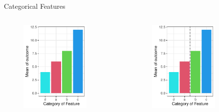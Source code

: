 \documentclass[11pt,compress,t,notes=noshow, xcolor=table]{beamer}
\begin{document}
\begin{vbframe}{Categorical Features}
\begin{columns}
\begin{column}{0.33\textwidth}
\begin{figure}
  \includegraphics[width=0.8\textwidth]{figure/categoryplot-cont2.pdf} 
  \end{figure}
  \end{column}
  \begin{column}{0.33\textwidth}
  \begin{figure}
  \includegraphics[width=0.8\textwidth]{figure/categoryplot-cont3.pdf} 
  \end{figure}
  \end{column}
  \end{columns}


\end{vbframe}
\end{document}
